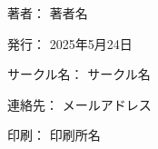 \clearpage
{}
\begin{flushright}
\begin{minipage}{0.5\hsize}
\begin{description}
  \item{著者：} 著者名
  \item{発行：} 2025年5月24日
  \item{サークル名：} サークル名
  \item{連絡先：} メールアドレス
  \item{印刷：} 印刷所名
\end{description}
\end{minipage}
\end{flushright}
\clearpage